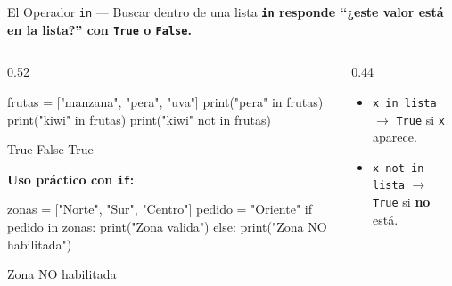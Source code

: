 \documentclass[aspectratio=169, 11pt]{beamer}
\begin{document}
\begin{frame}[fragile,shrink=35]{El Operador \texttt{in} --- Buscar dentro de una lista}
  \vspace{-6pt}
  {\small\color{arcaDark}\bfseries
    \texttt{in} responde ``¿este valor está en la lista?''
    con \texttt{True} o \texttt{False}.}

  \vspace{4pt}
  \begin{columns}[T]
    \begin{column}{0.52\textwidth}
      \begin{pyblock}
frutas = ["manzana", "pera", "uva"]
print("pera" in frutas)
print("kiwi" in frutas)
print("kiwi" not in frutas)
      \end{pyblock}
      \vspace{-2pt}
      \begin{outputblock}
True
False
True
      \end{outputblock}

      \vspace{3pt}
      {\footnotesize\color{arcaDark}\bfseries Uso práctico con \texttt{if}:}
      \vspace{2pt}
      \begin{pyblock}
zonas = ["Norte", "Sur", "Centro"]
pedido = "Oriente"
if pedido in zonas:
    print("Zona valida")
else:
    print("Zona NO habilitada")
      \end{pyblock}
      \vspace{-2pt}
      \begin{outputblock}
Zona NO habilitada
      \end{outputblock}
    \end{column}

    \begin{column}{0.44\textwidth}
      \vspace{2pt}
      {\footnotesize\color{textMuted}
      \begin{itemize}\setlength{\itemsep}{4pt}
        \item[{\color{arcaRed}\scriptsize\faArrowRight}]
          \texttt{x in lista} $\rightarrow$
          \texttt{True} si \texttt{x} aparece.

        \item[{\color{arcaRed}\scriptsize\faArrowRight}]
          \texttt{x not in lista} $\rightarrow$
          \texttt{True} si \textbf{no} está.


\end{itemize}}
\end{column}
\end{columns}
\end{frame}
\end{document}
